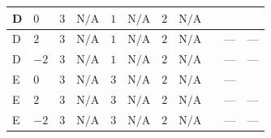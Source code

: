 \documentclass[8pt]{article}
\begin{document}
\begin{landscape}
\begin{longtable}{@{}llcccccc >{\raggedright\arraybackslash}p{0.21\linewidth} >{\raggedright\arraybackslash}p{0.21\linewidth} >{\raggedright\arraybackslash}p{0.21\linewidth}@{}}
D & $0$ & $3$ & $\text{N/A}$ & $1$ & $\text{N/A}$ & $2$ & $\text{N/A}$ & \scriptsize\adjustbox{max width=\linewidth}{$\begin{gathered} 4 {\lambda_5} \left({\lambda_5}\right)^{*}\end{gathered}$} & \scriptsize\adjustbox{max width=\linewidth}{$\begin{gathered} +20 {\lambda_{X_{9}}} \left({\lambda_{X_{5}}^{(1)}}\right)^{*}\end{gathered}$} & \scriptsize\adjustbox{max width=\linewidth}{$\begin{gathered} +4 {\lambda_{X_{5}}^{(1)}} (4 \left({\lambda_{X_{5}}^{(1)}}\right)^{*}+5 \left({\lambda_{X_{9}}}\right)^{*})\end{gathered}$} \\
\midrule
D & $2$ & $3$ & $\text{N/A}$ & $1$ & $\text{N/A}$ & $2$ & $\text{N/A}$ & \scriptsize\adjustbox{max width=\linewidth}{$\begin{gathered} 4 {\lambda_5} \left({\lambda_5}\right)^{*}\end{gathered}$} & --- & --- \\
\midrule
D & $-2$ & $3$ & $\text{N/A}$ & $1$ & $\text{N/A}$ & $2$ & $\text{N/A}$ & \scriptsize\adjustbox{max width=\linewidth}{$\begin{gathered} 4 {\lambda_5} \left({\lambda_5}\right)^{*}\end{gathered}$} & --- & --- \\
\midrule
E & $0$ & $3$ & $\text{N/A}$ & $3$ & $\text{N/A}$ & $2$ & $\text{N/A}$ & \scriptsize\adjustbox{max width=\linewidth}{$\begin{gathered} 2 {\lambda_5} \left({\lambda_5}\right)^{*}\end{gathered}$} & --- & \scriptsize\adjustbox{max width=\linewidth}{$\begin{gathered} +4 {\lambda_{X_{5}}^{(1)}} (4 \left({\lambda_{X_{5}}^{(1)}}\right)^{*}+5 \left({\lambda_{X_{9}}}\right)^{*})\end{gathered}$} \\
\midrule
E & $2$ & $3$ & $\text{N/A}$ & $3$ & $\text{N/A}$ & $2$ & $\text{N/A}$ & \scriptsize\adjustbox{max width=\linewidth}{$\begin{gathered} 2 {\lambda_5} \left({\lambda_5}\right)^{*}\end{gathered}$} & --- & --- \\
\midrule
E & $-2$ & $3$ & $\text{N/A}$ & $3$ & $\text{N/A}$ & $2$ & $\text{N/A}$ & \scriptsize\adjustbox{max width=\linewidth}{$\begin{gathered} 2 {\lambda_5} \left({\lambda_5}\right)^{*}\end{gathered}$} & --- & --- \\

\end{longtable}
\end{landscape}
\end{document}
